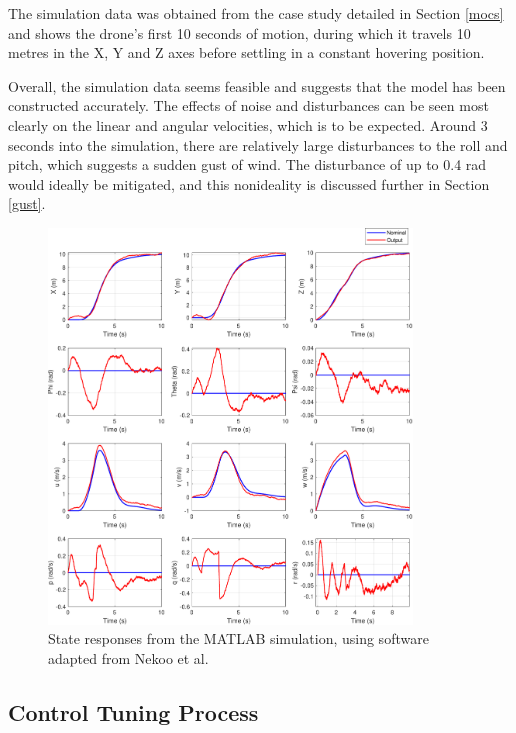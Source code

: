 The simulation data was obtained from the case study detailed in Section \ref{mocs} and shows the drone's first 10 seconds of motion, during which it travels 10 metres in the X, Y and Z axes before settling in a constant hovering position. 

Overall, the simulation data seems feasible and suggests that the model has been constructed accurately. The effects of noise and disturbances can be seen most clearly on the linear and angular velocities, which is to be expected. Around 3 seconds into the simulation, there are relatively large disturbances to the roll and pitch, which suggests a sudden gust of wind. The disturbance of up to 0.4 rad would ideally be mitigated, and this nonideality is discussed further in Section \ref{gust}. 



\begin{figure}[H]
\centering
\includegraphics[width=0.86\textwidth]{figs/Samuel/Figures/twelveplotsvectorgraphic.pdf}
\caption{State responses from the MATLAB simulation, using software adapted from Nekoo et al. \cite{nekoo}}
\label{fig:12sims}
\end{figure}










\subsection{Control Tuning Process}

